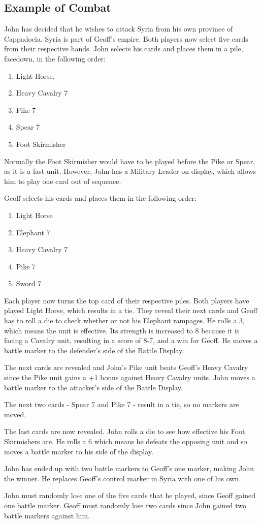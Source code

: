 \subsection{Example of Combat}

John has decided that he wishes to attack Syria from his own province of Cappadocia. Syria is part of Geoff's empire. Both players now select five cards from their respective hands. John selects his cards and places them in a pile, facedown, in the following order:

\begin{enumerate}[nosep]
  \item Light Horse,
  \item Heavy Cavalry 7
  \item Pike 7
  \item Spear 7
  \item Foot Skirmisher
\end{enumerate}

Normally the Foot Skirmisher would have to be played before the Pike or Spear, as it is a fast unit. However, John has a Military Leader on display, which allows him to play one card out of sequence.

Geoff selects his cards and places them in the following order:

\begin{enumerate}[nosep]
  \item Light Horse
  \item Elephant 7
  \item Heavy Cavalry 7
  \item Pike 7
  \item Sword 7
\end{enumerate}

Each player now turns the top card of their respective piles. Both players have played Light Horse, which results in a tie. They reveal their next cards and Geoff has to roll a die to check whether or not his Elephant rampages. He rolls a 3, which means the unit is effective. Its strength is increased to 8 because it is facing a Cavalry unit, resulting in a score of 8-7, and a win for Geoff. He moves a battle marker to the defender’s side of the Battle Display.

The next cards are revealed and John’s Pike unit beats Geoff’s Heavy Cavalry since the Pike unit gains a +1 bonus against Heavy Cavalry units. John moves a battle marker to the attacker’s side of the Battle Display.

The next two cards - Spear 7 and Pike 7 - result in a tie, so no markers are moved.

The last cards are now revealed. John rolls a die to see how effective his Foot Skirmishers are. He rolls a 6 which means he defeats the opposing unit and so moves a battle marker to his side of the display.

John has ended up with two battle markers to Geoff’s one marker, making John the winner. He replaces Geoff’s control marker in Syria with one of his own.

John must randomly lose one of the five cards that he played, since Geoff gained one battle marker. Geoff must randomly lose two cards since John gained two battle markers against him.
